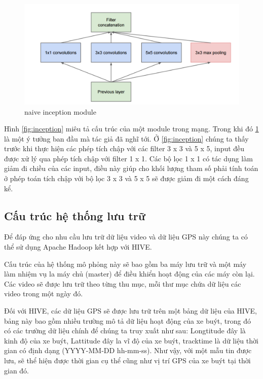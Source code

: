 	\begin{figure}[h!]
			\centering
			\includegraphics[scale=0.3]{charts/inception_nai.png}
			\caption{naive inception module \cite{1}}
			\label{fig:nai_inception}
	\end{figure}
	
	Hình \ref{fig:inception} miêu tả cấu trúc của một module trong mạng. Trong khi đó \ref{fig:nai_inception} là một ý tưởng ban đầu mà tác giả đã nghĩ tới. Ở \ref{fig:inception} chúng ta thấy trước khi thực hiện các phép tích chập với các filter 3 x 3 và 5 x 5, input đều được xử lý qua phép tích chập với filter 1 x 1. Các bộ lọc 1 x 1 có tác dụng làm giảm đi chiều của các input\cite{2}, điều này giúp cho khối lượng tham số phải tính toán ở phép toán tích chập với bộ lọc 3 x 3 và 5 x 5 sẽ được giảm đi một cách đáng kể.
	
	\subsection{Cấu trúc hệ thống lưu trữ}
	Để đáp ứng cho nhu cầu lưu trữ dữ liệu video và dữ liệu GPS này chúng ta có thể sử dụng Apache Hadoop kết hợp với HIVE.\par 
	Cấu trúc của hệ thống mô phỏng này sẽ bao gồm ba máy lưu trữ và một máy làm nhiệm vụ la máy chủ (master) để điều khiển hoạt động của các máy còn lại. Các video sẽ được lưu trữ theo từng thu mục, mỗi thư mục chứa dữ liệu các video trong một ngày đó.\par 
	Đối với HIVE, các dữ liệu GPS sẽ được lưu trữ trên một bảng dữ liệu của HIVE, bảng này bao gồm nhiều trường mô tả dữ liệu hoạt động của xe buýt, trong đó có các trường dữ liệu chính để chúng ta truy xuất như sau: Longtitude đây là kinh độ của xe buýt, Lattitude đây la vĩ độ của xe buýt, tracktime là dữ liệu thời gian có định dạng (YYYY-MM-DD hh-mm-ss). Như vậy, với một mẫu tin được lưu, sẽ thể hiện được thời gian cụ thể cũng như vị trí GPS của xe buýt tại thời gian đó.
